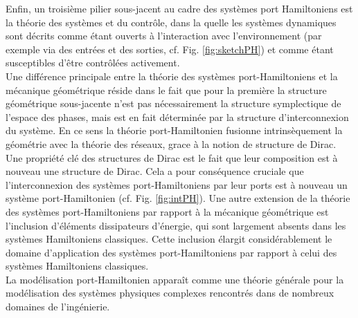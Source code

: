 \documentclass[12pt, french]{article}
\begin{document}
Enfin, un troisième pilier sous-jacent au cadre des systèmes port Hamiltoniens est la théorie des systèmes et du contrôle, dans la quelle les systèmes dynamiques sont décrits comme étant ouverts à l'interaction avec l'environnement (par exemple via des entrées et des sorties, cf. Fig. \ref{fig:sketchPH}) et comme étant susceptibles d'être contrôlées activement. \\


Une différence principale entre la théorie des systèmes port-Hamiltoniens et la mécanique géométrique réside dans le fait que pour la première la structure géométrique sous-jacente n'est pas nécessairement la structure symplectique de l'espace des phases, mais est en fait déterminée par la structure d'interconnexion du système.  En ce sens la théorie port-Hamiltonien fusionne intrinsèquement la géométrie avec la théorie des réseaux, grace \`a la notion de structure de Dirac. Une propriété clé des structures de Dirac est le fait que leur composition est à nouveau une structure de Dirac. Cela a pour conséquence cruciale que l'interconnexion des systèmes port-Hamiltoniens par leur ports est à nouveau un système port-Hamiltonien (cf. Fig. \ref{fig:intPH}). Une autre extension de la théorie des systèmes port-Hamiltoniens par rapport à la mécanique géométrique est l'inclusion d'éléments dissipateurs d'énergie, qui sont largement absents dans les systèmes Hamiltoniens classiques. Cette inclusion élargit considérablement le domaine d'application des systèmes port-Hamiltoniens par rapport à celui des systèmes Hamiltoniens classiques. \\

La modélisation port-Hamiltonien apparaît comme une théorie générale pour la modélisation des systèmes physiques complexes rencontrés dans de nombreux domaines de l'ingénierie.
\end{document}
